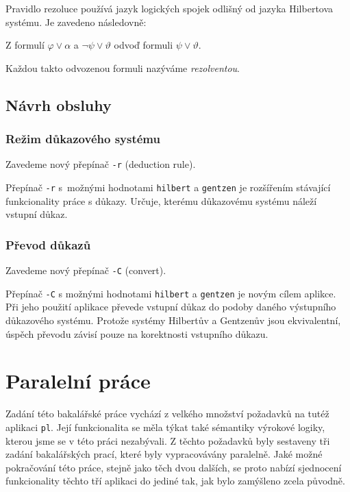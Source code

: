 \documentclass[thesis=B,czech,hidelinks]{thesis}[2012/06/26]
\begin{document}
Pravidlo rezoluce používá jazyk logických spojek odlišný od jazyka Hilbertova systému. Je zavedeno následovně:

\begin{dfn}
Z formulí $\varphi \vee \alpha$ a $\neg \psi \vee \vartheta$ odvoď formuli $\psi \vee \vartheta$\cite{sochor}.
\end{dfn}

Každou takto odvozenou formuli nazýváme \emph{rezolventou}.

\subsection{Návrh obsluhy}

\subsubsection{Režim důkazového systému}

Zavedeme nový přepínač \texttt{-r} (deduction rule).

Přepínač \texttt{-r} s~možnými hodnotami \texttt{hilbert} a \texttt{gentzen} je rozšířením stávající funkcionality práce s důkazy. Určuje, kterému důkazovému systému náleží vstupní důkaz.

\subsubsection{Převod důkazů}

Zavedeme nový přepínač \texttt{-C} (convert).

Přepínač \texttt{-C} s možnými hodnotami \texttt{hilbert} a \texttt{gentzen} je novým cílem aplikce. Při jeho použití aplikace převede vstupní důkaz do podoby daného výstupního důkazového systému. Protože systémy Hilbertův a Gentzenův jsou ekvivalentní, úspěch převodu závisí pouze na korektnosti vstupního důkazu.

\section{Paralelní práce}

Zadání této bakalářské práce vychází z velkého množství požadavků na tutéž aplikaci \texttt{pl}. Její funkcionalita se měla týkat také sémantiky výrokové logiky, kterou jsme se v této práci nezabývali. Z těchto požadavků byly sestaveny tři zadání bakalářských prací, které byly vypracovávány paralelně. Jaké možné pokračování této práce, stejně jako těch dvou dalších, se proto nabízí sjednocení funkcionality těchto tří aplikaci do jediné tak, jak bylo zamýšleno zcela původně.
\end{document}

